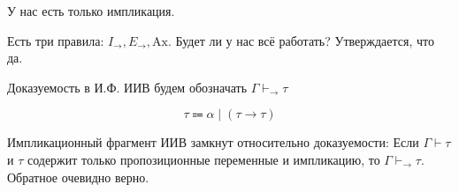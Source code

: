 У нас есть только импликация. %

Есть три правила: \(I_{\to}, E_{\to}, \mathrm{Ax}\). Будет ли у нас всё работать? Утверждается, что да.

\begin{obozn}
    Доказуемость в И.Ф. ИИВ будем обозначать \(\Gamma \vdash_{\to} \tau\)
\end{obozn}

\begin{definition}
    \[\tau \Coloneqq \alpha \mid (\tau \to \tau)\]
\end{definition}

\begin{theorem}
    Импликационный фрагмент ИИВ замкнут относительно доказуемости:
    Если \(\Gamma \vdash \tau\) и \(\tau\) содержит только пропозиционные переменные и импликацию, то \(\Gamma \vdash_{\to} \tau\). Обратное очевидно верно.
\end{theorem}
